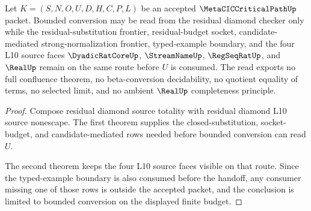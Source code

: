 \begin{theorem}
\label{thm:metacic-critical-path-residual-diamond-bounded-conversion-nonescape}
Let $K=(S,N,O,U,D,H,C,P,L)$ be an accepted $\MetaCICCriticalPathUp$ packet. Bounded conversion may be read from the residual diamond checker only while the residual-substitution frontier, residual-budget socket, candidate-mediated strong-normalization frontier, typed-example boundary, and the four L10 source faces $\DyadicRatCoreUp$, $\StreamNameUp$, $\RegSeqRatUp$, and $\RealUp$ remain on the same route before $U$ is consumed. The read exports no full confluence theorem, no beta-conversion decidability, no quotient equality of terms, no selected limit, and no ambient $\RealUp$ completeness principle.
\end{theorem}
\begin{proof}
Compose residual diamond source totality with residual diamond L10 source nonescape. The first theorem supplies the closed-substitution, socket-budget, and candidate-mediated rows needed before bounded conversion can read $U$.

The second theorem keeps the four L10 source faces visible on that route. Since the typed-example boundary is also consumed before the handoff, any consumer missing one of those rows is outside the accepted packet, and the conclusion is limited to bounded conversion on the displayed finite budget.
\end{proof}

